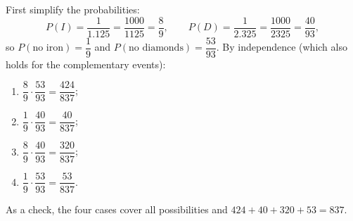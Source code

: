 First simplify the probabilities:
\[P(I)=\dfrac{1}{1.125}=\dfrac{1000}{1125}=\dfrac89,\qquad P(D)=\dfrac{1}{2.325}=\dfrac{1000}{2325}=\dfrac{40}{93},\]
so $P(\text{no iron})=\dfrac19$ and $P(\text{no diamonds})=\dfrac{53}{93}$. By independence (which also holds for the complementary events):
\begin{enumerate}
\item[(a)] $\dfrac89\cdot\dfrac{53}{93}=\boxed{\dfrac{424}{837}}$;
\item[(b)] $\dfrac19\cdot\dfrac{40}{93}=\boxed{\dfrac{40}{837}}$;
\item[(c)] $\dfrac89\cdot\dfrac{40}{93}=\boxed{\dfrac{320}{837}}$;
\item[(d)] $\dfrac19\cdot\dfrac{53}{93}=\boxed{\dfrac{53}{837}}$.
\end{enumerate}
As a check, the four cases cover all possibilities and $424+40+320+53=837$.
